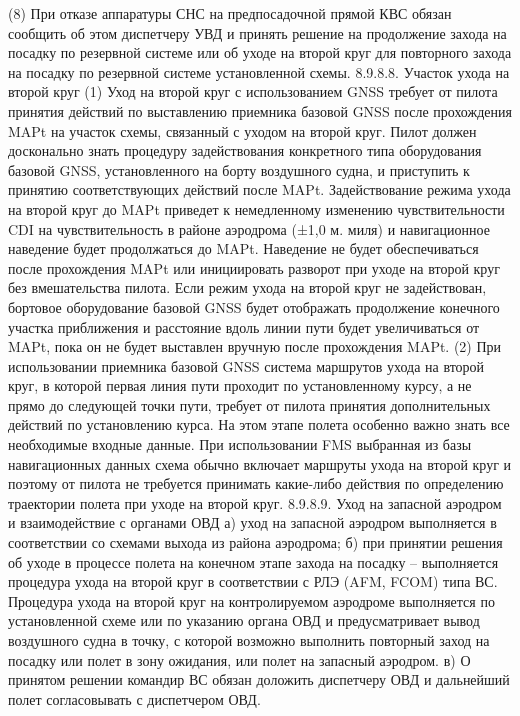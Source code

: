 (8) При отказе аппаратуры СНС на предпосадочной прямой КВС обязан сообщить об этом диспетчеру УВД и принять решение на продолжение захода на посадку по резервной системе или об уходе на второй круг для повторного захода на посадку по резервной системе установленной схемы.
8.9.8.8.	Участок ухода на второй круг
(1) Уход на второй круг с использованием GNSS требует от пилота принятия действий по выставлению приемника базовой GNSS после прохождения MAPt на участок схемы, связанный с уходом на второй круг. Пилот должен досконально знать процедуру задействования конкретного типа оборудования базовой GNSS, установленного на борту воздушного судна, и приступить к принятию соответствующих действий после MAPt. Задействование режима ухода на второй круг до MAPt приведет к немедленному изменению чувствительности CDI на чувствительность в районе аэродрома (±1,0 м. миля) и навигационное наведение будет продолжаться до MAPt. Наведение не будет обеспечиваться после прохождения MAPt или инициировать разворот при уходе на второй круг без вмешательства пилота. Если режим ухода на второй круг не задействован, бортовое оборудование базовой GNSS будет отображать продолжение конечного участка приближения и расстояние вдоль линии пути будет увеличиваться от MAPt, пока он не будет выставлен вручную после прохождения MAPt.
(2) При использовании приемника базовой GNSS система маршрутов ухода на второй круг, в которой первая линия пути проходит по установленному курсу, а не прямо до следующей точки пути, требует от пилота принятия дополнительных действий по установлению курса. На этом этапе полета особенно важно знать все необходимые входные данные.
При использовании FMS выбранная из базы навигационных данных схема обычно включает маршруты ухода на второй круг и поэтому от пилота не требуется принимать какие-либо действия по определению траектории полета при уходе на второй круг.
8.9.8.9.	Уход на запасной аэродром и взаимодействие с органами ОВД 
а)	уход на запасной аэродром выполняется в соответствии со схемами выхода из района аэродрома; 
б)	при принятии решения об уходе в процессе полета на конечном этапе захода на посадку – выполняется процедура ухода на второй круг в соответствии с РЛЭ (AFM, FCOM) типа ВС. 
Процедура ухода на второй круг на контролируемом аэродроме выполняется по установленной схеме или по указанию органа ОВД и предусматривает вывод воздушного судна в точку, с которой возможно выполнить повторный заход на посадку или полет в зону ожидания, или полет на запасный аэродром. 
в)	О принятом решении командир ВС обязан доложить диспетчеру ОВД и дальнейший полет согласовывать с диспетчером ОВД.
